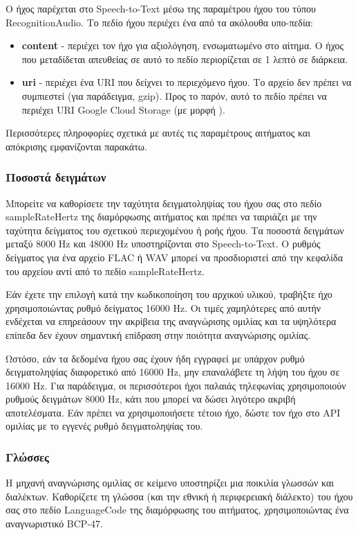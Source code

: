 \documentclass[oneside, 12pt]{book}
\begin{document}
Ο ήχος παρέχεται στο Speech-to-Text μέσω της παραμέτρου ήχου του τύπου RecognitionAudio. Το πεδίο ήχου περιέχει ένα από τα ακόλουθα υπο-πεδία:
\begin{itemize}
  \item \textbf{content} - περιέχει τον ήχο για αξιολόγηση, ενσωματωμένο στο αίτημα. Ο ήχος που μεταδίδεται απευθείας σε αυτό το πεδίο περιορίζεται σε 1 λεπτό σε διάρκεια.
  \item \textbf{uri} - περιέχει ένα URI που δείχνει το περιεχόμενο ήχου. Το αρχείο δεν πρέπει να συμπιεστεί (για παράδειγμα, gzip). Προς το παρόν, αυτό το πεδίο πρέπει να περιέχει URI Google Cloud Storage (με μορφή ).
\end{itemize}
Περισσότερες πληροφορίες σχετικά με αυτές τις παραμέτρους αιτήματος και απόκρισης εμφανίζονται παρακάτω.
\subsubsection{Ποσοστά δειγμάτων}
Μπορείτε να καθορίσετε την ταχύτητα δειγματοληψίας του ήχου σας στο πεδίο sampleRateHertz της διαμόρφωσης αιτήματος και πρέπει να ταιριάζει με την ταχύτητα δείγματος του σχετικού περιεχομένου ή ροής ήχου. Τα ποσοστά δειγμάτων μεταξύ 8000 Hz και 48000 Hz υποστηρίζονται στο Speech-to-Text. Ο ρυθμός δείγματος για ένα αρχείο FLAC ή WAV μπορεί να προσδιοριστεί από την κεφαλίδα του αρχείου αντί από το πεδίο sampleRateHertz.

Εάν έχετε την επιλογή κατά την κωδικοποίηση του αρχικού υλικού, τραβήξτε ήχο χρησιμοποιώντας ρυθμό δείγματος 16000 Hz. Οι τιμές χαμηλότερες από αυτήν ενδέχεται να επηρεάσουν την ακρίβεια της αναγνώρισης ομιλίας και τα υψηλότερα επίπεδα δεν έχουν σημαντική επίδραση στην ποιότητα αναγνώρισης ομιλίας.

Ωστόσο, εάν τα δεδομένα ήχου σας έχουν ήδη εγγραφεί με υπάρχον ρυθμό δειγματοληψίας διαφορετικό από 16000 Hz, μην επαναλάβετε τη λήψη του ήχου σε 16000 Hz. Για παράδειγμα, οι περισσότεροι ήχοι παλαιάς τηλεφωνίας χρησιμοποιούν ρυθμούς δειγμάτων 8000 Hz, κάτι που μπορεί να δώσει λιγότερο ακριβή αποτελέσματα. Εάν πρέπει να χρησιμοποιήσετε τέτοιο ήχο, δώστε τον ήχο στο API ομιλίας με το εγγενές ρυθμό δειγματοληψίας του.
\subsubsection{Γλώσσες}
Η μηχανή αναγνώρισης ομιλίας σε κείμενο υποστηρίζει μια ποικιλία γλωσσών και διαλέκτων. Καθορίζετε τη γλώσσα (και την εθνική ή περιφερειακή διάλεκτο) του ήχου σας στο πεδίο LanguageCode της διαμόρφωσης του αιτήματος, χρησιμοποιώντας ένα αναγνωριστικό BCP-47.
\end{document}
